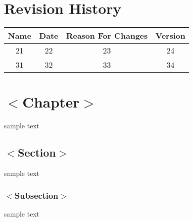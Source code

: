 \documentclass[a4paper]{scrreprt}
\begin{document}
\tableofcontents

\listoffigures

\chapter*{Revision History}

\begin{center}
    \begin{tabular}{|c|c|c|c|}
        \hline
	    Name & Date & Reason For Changes & Version\\
        \hline
	    21 & 22 & 23 & 24\\
        \hline
	    31 & 32 & 33 & 34\\
        \hline
    \end{tabular}
\end{center}

\chapter{$<$Chapter$>$}
sample text

\section{$<$Section$>$}
sample text

\subsection{$<$Subsection$>$}
sample text
\end{document}
